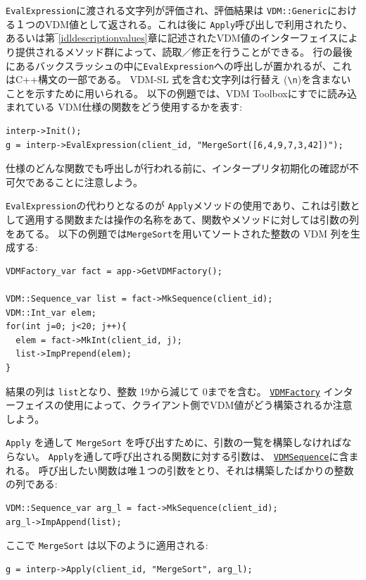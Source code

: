 \documentclass[\pformat,12pt]{jarticle}
\newcommand{\VDMFactory}{\hyperlink{interface.VDMFactory}{VDMFactory}}
\newcommand{\VDMSequence}{\hyperlink{interface.VDMSequence}{VDMSequence}}
\begin{document}
 {\tt EvalExpression}に渡される文字列が評価され、評価結果は {\tt VDM::Generic}における１つのVDM値として返される。これは後に {\tt Apply}呼び出しで利用されたり、あるいは第‾\ref{idldescriptionvalues}章に記述されたVDM値のインターフェイスにより提供されるメソッド群によって、読取／修正を行うことができる。
行の最後にあるバックスラッシュの中に\texttt{EvalExpression}への呼出しが置かれるが、これはC++構文の一部である。
 VDM-SL 式を含む文字列は行替え (\verb+\n+)を含まないことを示すために用いられる。
以下の例題では、VDM Toolboxにすでに読み込まれている VDM仕様の関数をどう使用するかを表す: 

\begin{verbatim}
interp->Init();
g = interp->EvalExpression(client_id, "MergeSort([6,4,9,7,3,42])");
\end{verbatim}

仕様のどんな関数でも呼出しが行われる前に、インタープリタ初期化の確認が不可欠であることに注意しよう。

{\tt EvalExpression}の代わりとなるのが {\tt  Apply}メソッドの使用であり、これは引数として適用する関数または操作の名称をあて、関数やメソッドに対しては引数の列をあてる。
以下の例題では{\tt MergeSort}を用いてソートされた整数の VDM 列を生成する:

\begin{verbatim}
VDMFactory_var fact = app->GetVDMFactory();
    
VDM::Sequence_var list = fact->MkSequence(client_id);
VDM::Int_var elem;
for(int j=0; j<20; j++){
  elem = fact->MkInt(client_id, j);
  list->ImpPrepend(elem);
}
\end{verbatim}

結果の列は {\tt list}となり、整数 19から減じて 0までを含む。 
 {\tt \VDMFactory} インターフェイスの使用によって、クライアント側でVDM値がどう構築されるか注意しよう。

{\tt Apply} を通して {\tt MergeSort} を呼び出すために、引数の一覧を構築しなければならない。
{\tt Apply}を通して呼び出される関数に対する引数は、  {\tt  \VDMSequence}に含まれる。
呼び出したい関数は唯１つの引数をとり、それは構築したばかりの整数の列である:

\begin{verbatim}
VDM::Sequence_var arg_l = fact->MkSequence(client_id);
arg_l->ImpAppend(list);
\end{verbatim}

ここで \texttt{MergeSort} は以下のように適用される:

\begin{verbatim}
g = interp->Apply(client_id, "MergeSort", arg_l);
\end{verbatim}
\end{document}
